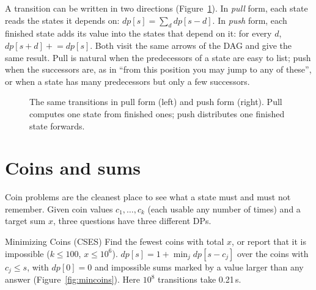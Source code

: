A transition can be written in two directions (Figure~\ref{fig:pullpush}). In \emph{pull} form, each state reads the states it
depends on: $dp[s] = \sum_d dp[s - d]$. In \emph{push} form, each finished state adds its value into the states that depend on it:
for every $d$, $dp[s + d] \mathrel{+}= dp[s]$. Both visit the same arrows of the DAG and give the same result. Pull is natural when
the predecessors of a state are easy to list; push when the successors are, as in ``from this position you may jump to any of
these'', or when a state has many predecessors but only a few successors.

\begin{figure}[htbp]
\centering
{}
\caption{The same transitions in pull form (left) and push form (right). Pull computes one state from finished ones; push
distributes one finished state forwards.}
\label{fig:pullpush}
\end{figure}

\section[Coins and sums]{Coins and sums \hfill \gold}\label{sec:dp-coins}

Coin problems are the cleanest place to see what a state must and must not remember. Given coin values $c_1, \dots, c_k$ (each
usable any number of times) and a target sum $x$, three questions have three different DPs.

\begin{problem}{Minimizing Coins (CSES)}
Find the fewest coins with total $x$, or report that it is impossible ($k \le 100$, $x \le 10^6$).
\solution $dp[s] = 1 + \min_j dp[s - c_j]$ over the coins with $c_j \le s$, with $dp[0] = 0$ and impossible sums marked by a value
larger than any answer (Figure~\ref{fig:mincoins}). Here $10^8$ transitions take 0.21\,s.
\end{problem}

